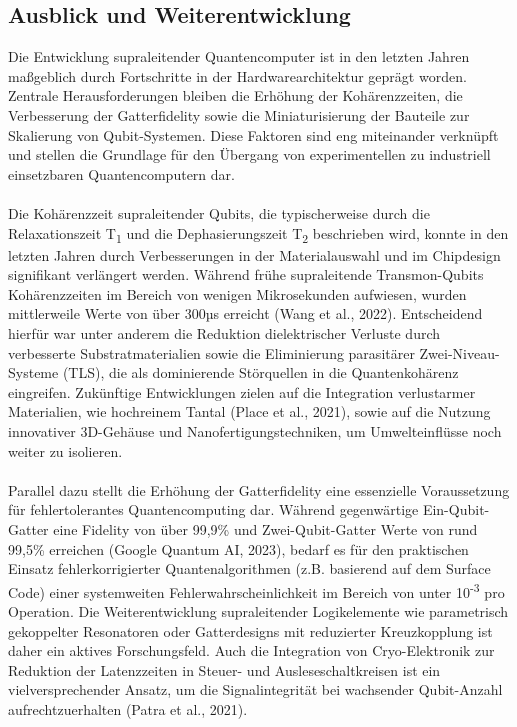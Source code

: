\subsection{Ausblick und Weiterentwicklung}
Die Entwicklung supraleitender Quantencomputer ist in den letzten Jahren maßgeblich durch Fortschritte in der Hardwarearchitektur geprägt worden. Zentrale Herausforderungen bleiben die Erhöhung der Kohärenzzeiten, die Verbesserung der Gatterfidelity sowie die Miniaturisierung der Bauteile zur Skalierung von Qubit-Systemen. Diese Faktoren sind eng miteinander verknüpft und stellen die Grundlage für den Übergang von experimentellen zu industriell einsetzbaren Quantencomputern dar.\\\\
Die Kohärenzzeit supraleitender Qubits, die typischerweise durch die Relaxationszeit T\textsubscript{1} und die Dephasierungszeit T\textsubscript{2} beschrieben wird, konnte in den letzten Jahren durch Verbesserungen in der Materialauswahl und im Chipdesign signifikant verlängert werden. Während frühe supraleitende Transmon-Qubits Kohärenzzeiten im Bereich von wenigen Mikrosekunden aufwiesen, wurden mittlerweile Werte von über 300µs erreicht (Wang et al., 2022). Entscheidend hierfür war unter anderem die Reduktion dielektrischer Verluste durch verbesserte Substratmaterialien sowie die Eliminierung parasitärer Zwei-Niveau-Systeme (TLS), die als dominierende Störquellen in die Quantenkohärenz eingreifen. Zukünftige Entwicklungen zielen auf die Integration verlustarmer Materialien, wie hochreinem Tantal (Place et al., 2021), sowie auf die Nutzung innovativer 3D-Gehäuse und Nanofertigungstechniken, um Umwelteinflüsse noch weiter zu isolieren.\\\\
Parallel dazu stellt die Erhöhung der Gatterfidelity eine essenzielle Voraussetzung für fehlertolerantes Quantencomputing dar. Während gegenwärtige Ein-Qubit-Gatter eine Fidelity von über 99,9\% und Zwei-Qubit-Gatter Werte von rund 99,5\% erreichen (Google Quantum AI, 2023), bedarf es für den praktischen Einsatz fehlerkorrigierter Quantenalgorithmen (z.B. basierend auf dem Surface Code) einer systemweiten Fehlerwahrscheinlichkeit im Bereich von unter 10\textsuperscript{-3} pro Operation. Die Weiterentwicklung supraleitender Logikelemente wie parametrisch gekoppelter Resonatoren oder Gatterdesigns mit reduzierter Kreuzkopplung ist daher ein aktives Forschungsfeld. Auch die Integration von Cryo-Elektronik zur Reduktion der Latenzzeiten in Steuer- und Ausleseschaltkreisen ist ein vielversprechender Ansatz, um die Signalintegrität bei wachsender Qubit-Anzahl aufrechtzuerhalten (Patra et al., 2021).\\\\
